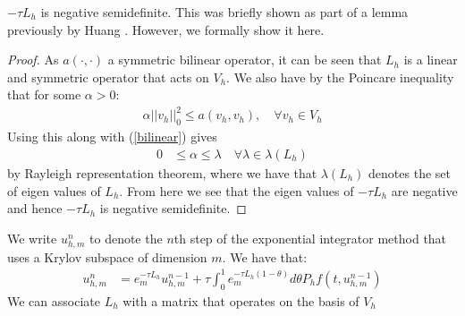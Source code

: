 \begin{lemma} \label{lemma:LHnegativeSD}
    $-\tau L_h$ is negative semidefinite. 
    This was briefly shown as part of a lemma previously by Huang \cite{Huang2022}. However, we formally show it here.
\end{lemma}    
\begin{proof}
    As $a(\cdot,\cdot)$ a symmetric bilinear operator, it can be seen that $L_h$ is a linear and symmetric operator that acts on $V_h$.
    We also have by the Poincare inequality that for some $\alpha > 0$:
    \begin{align*}
        \alpha ||v_h||^2_0 \leq a(v_h, v_h), \quad \forall v_h \in V_h
    \end{align*}
    Using this along with (\ref{bilinear}) gives
    \begin{align*}
        0 &\leq \alpha \leq \lambda \quad \forall \lambda \in \lambda(L_h)
    \end{align*} %
    by Rayleigh representation theorem, where we have that $\lambda(L_h)$ denotes the set of eigen values of $L_h$.
    From here we see that the eigen values of $-\tau L_h$ are negative and hence $-\tau L_h$ is negative semidefinite.
\end{proof}

\begin{definition}
    We write $u_{h,m}^n$ to denote the $n$th step of the exponential integrator method that uses a Krylov subspace of dimension $m$.
    We have that:
    \begin{align*}
        u_{h,m}^n &= e_m^{-\tau L_h} u_{h,m}^{n-1} + \tau \int^1_0e_m^{-\tau L_h(1-\theta)}d\theta P_hf(t, u_{h,m}^{n-1})
    \end{align*}
    We can associate $L_h$ with a matrix that operates on the basis of $V_h$
\end{definition}

